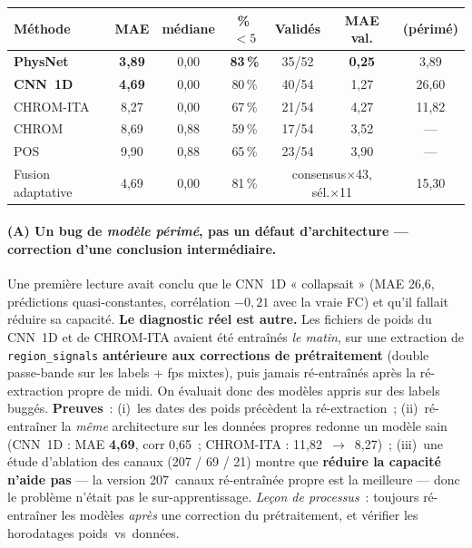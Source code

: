 \documentclass[11pt,a4paper]{article}
\newcommand{\ok}[1]{\textcolor{good}{#1}}
\newcommand{\ko}[1]{\textcolor{bad}{#1}}
\begin{document}
\begin{center}
\begin{tabular}{@{}lccccc|c@{}}
\toprule
Méthode & MAE & médiane & \%\,$<5$ & Validés & MAE val. & (périmé) \\
\midrule
\textbf{PhysNet}   & \ok{\textbf{3,89}} & 0,00 & \ok{\textbf{83\,\%}} & 35/52 & \ok{\textbf{0,25}} & 3,89 \\
\textbf{CNN~1D}    & \ok{\textbf{4,69}} & 0,00 & 80\,\% & 40/54 & 1,27 & \ko{26,60} \\
CHROM-ITA          & 8,27 & 0,00 & 67\,\% & 21/54 & 4,27 & 11,82 \\
CHROM              & 8,69 & 0,88 & 59\,\% & 17/54 & 3,52 & --- \\
POS                & 9,90 & 0,88 & 65\,\% & 23/54 & 3,90 & --- \\
\midrule
Fusion adaptative  & 4,69 & 0,00 & 81\,\% & \multicolumn{2}{c}{consensus×43, sél.×11} & \ko{15,30} \\
\bottomrule
\end{tabular}
\end{center}

\paragraph{(A) Un bug de \emph{modèle périmé}, pas un défaut d'architecture
--- correction d'une conclusion intermédiaire.} Une première lecture avait conclu
que le CNN~1D « collapsait » (MAE 26,6, prédictions quasi-constantes, corrélation
$-0{,}21$ avec la vraie FC) et qu'il fallait réduire sa capacité. \textbf{Le
diagnostic réel est autre.} Les fichiers de poids du CNN~1D et de CHROM-ITA avaient
été entraînés \emph{le matin}, sur une extraction de \texttt{region\_signals}
\textbf{antérieure aux corrections de prétraitement} (double passe-bande sur les
labels + fps mixtes), puis jamais ré-entraînés après la ré-extraction propre de
midi. On évaluait donc des modèles appris sur des labels buggés. \textbf{Preuves}~:
(i)~les dates des poids précèdent la ré-extraction~; (ii)~ré-entraîner la
\emph{même} architecture sur les données propres redonne un modèle sain
(CNN~1D : MAE \textbf{4,69}, corr 0,65~; CHROM-ITA : 11,82~$\rightarrow$~8,27)~;
(iii)~une étude d'ablation des canaux (207 / 69 / 21) montre que \textbf{réduire la
capacité n'aide pas} --- la version 207~canaux ré-entraînée propre est la meilleure
--- donc le problème n'était pas le sur-apprentissage. \emph{Leçon de processus}~:
toujours ré-entraîner les modèles \emph{après} une correction du prétraitement, et
vérifier les horodatages poids~vs~données.
\end{document}
